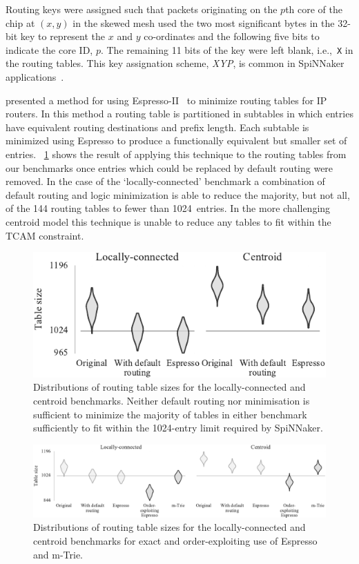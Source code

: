 \documentclass[conference]{IEEEtran}
\newcommand{\mytt}[1]{\texttt{\footnotesize#1}}
\begin{document}
Routing keys were assigned such that packets originating on the $p$th core of the chip at $(x, y)$ in the skewed mesh used the two most significant bytes in the 32-bit key to represent the $x$ and $y$ co-ordinates and the following five bits to indicate the core ID, $p$.
The remaining 11 bits of the key were left blank, i.e.,~\mytt{X} in the routing tables.
This key assignation scheme, \textit{XYP}, is common in SpiNNaker applications~\parencite{Davies2012}.

\textcite{Liu2002} presented a method for using Espresso-II~\parencite{Brayton1984} to minimize routing tables for IP routers.
In this method a routing table is partitioned in subtables in which entries have equivalent routing destinations and prefix length.
Each subtable is minimized using Espresso to produce a functionally equivalent but smaller set of entries.
\figurename~\ref{fig:results/espresso_no_dc} shows the result of applying this technique to the routing tables from our benchmarks once entries which could be replaced by default routing were removed.
In the case of the `locally-connected' benchmark a combination of default routing and logic minimization is able to reduce the majority, but not all, of the 144 routing tables to fewer than \num{1024}~entries.
In the more challenging centroid model this technique is unable to reduce any tables to fit within the TCAM constraint.

\begin{figure}
  \centering
  \includegraphics{experiments/results_no_dc}
  \caption{
    Distributions of routing table sizes for the locally-connected and centroid benchmarks.
    Neither default routing nor minimisation is sufficient to minimize the majority of tables in either benchmark sufficiently to fit within the 1024-entry limit required by SpiNNaker.}
  \label{fig:results/espresso_no_dc}
\end{figure}

\begin{figure}[!t]
  \centering
  \includegraphics{experiments/results_with_esp_dc_and_mtrie}
  \caption{
    Distributions of routing table sizes for the locally-connected and centroid benchmarks for exact and order-exploiting use of Espresso and m-Trie.
  }
  \label{fig:results/espresso_with_dc_and_mtrie}
\end{figure}
\end{document}
